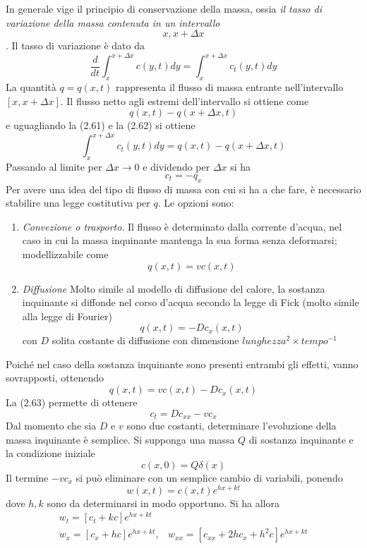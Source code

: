 \documentclass[a4paper,12pt, draft]{article}
\theoremstyle{break}
\numberwithin{equation}{section}
\begin{document}
In generale vige il principio di conservazione della massa, ossia \emph{il tasso di variazione della massa contenuta in un intervallo \[x, x+\Delta x\]}. Il tasso di variazione è dato da
\begin{equation}
  \frac{d}{dt} \int_x^{x+\Delta x} c(y,t)dy = \int_x^{x+\Delta x} c_t(y,t)dy
\end{equation}
La quantità \(q = q(x,t)\) rappresenta il flusso di massa entrante nell'intervallo \([x, x+\Delta x]\). Il flusso netto agli estremi dell'intervallo si ottiene come 
\begin{equation}
  q(x,t) - q(x+\Delta x, t)
\end{equation}
e uguagliando la (2.61) e la (2.62) si ottiene
\[
  \int_x^{x+\Delta x} c_t (y,t)dy = q(x,t) - q(x+\Delta x, t)
\]
Passando al limite per \(\Delta x \to 0\) e dividendo per \(\Delta x\) si ha
\begin{equation}
  c_t = -q_x
\end{equation}
Per avere una idea del tipo di flusso di massa con cui si ha a che fare, è necessario stabilire una legge costitutiva per \(q\). Le opzioni sono:
\begin{enumerate}
  \item \emph{Convezione o trasporto}. Il flusso è determinato dalla corrente d'acqua, nel caso in cui la massa inquinante mantenga la sua forma senza deformarsi; modellizzabile come
  \[
    q(x,t) = vc(x,t)
  \]
  \item \emph{Diffusione} Molto simile al modello di diffusione del calore, la sostanza inquinante si diffonde nel corso d'acqua secondo la legge di Fick (molto simile alla legge di Fourier)
  \[
    q(x,t) = -Dc_x(x,t)
  \]
  con \(D\) solita costante di diffusione con dimensione \(lunghezza^2 \times tempo^{-1}\)
\end{enumerate}
Poiché nel caso della sostanza inquinante sono presenti entrambi gli effetti, vanno sovrapposti, ottenendo
\[
  q(x,t) = vc(x,t) - Dc_x(x,t)
\]
La (2.63) permette di ottenere
\begin{equation}
  c_t = Dc_{xx}-vc_x
\end{equation}
Dal momento che sia \(D\) e \(v\) sono due costanti, determinare l'evoluzione della massa inquinante è semplice. Si supponga una massa \(Q\) di sostanza inquinante e la condizione iniziale
\[
  c(x,0) = Q\delta(x)
\]
Il termine \(-vc_x\) si può eliminare con un semplice cambio di variabili, ponendo
\[
  w(x,t) = c(x,t)e^{hx+kt}
\]
dove \(h, k\) sono da determinarsi in modo opportuno. Si ha allora
\[
\begin{array}{cc}
  w_t = [c_t + kc]e^{hx + kt} & \\
  w_x = [c_x + hc]e^{hx+kt}, & w_{xx} = [c_{xx} + 2hc_x + h^2c]e^{hx+kt} 
\end{array}  
\]
\end{document}
